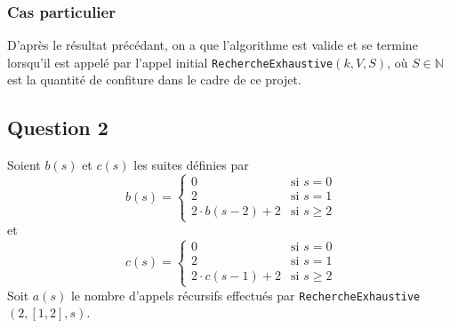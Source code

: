 \documentclass[12pt,a4paper]{article}
\begin{document}
\subsubsection*{Cas particulier}
D'apr\`es le r\'esultat pr\'ec\'edant, on a que l'algorithme est valide et se termine lorsqu'il est appel\'e par l'appel initial \texttt{RechercheExhaustive}$(k,V,S)$, o\`u $S \in \mathbb{N}$ est la quantit\'e de confiture dans le cadre de ce projet. 


\subsection*{Question 2}
Soient $b(s)$ et $c(s)$ les suites d\'efinies par
\[ b(s) = \begin{cases} 
      0 & \text{si } s = 0 \\
      2 & \text{si } s = 1 \\
      2\cdot b(s-2) + 2 & \text{si } s\geq 2 
   \end{cases}
\]
et
\[ c(s) = \begin{cases} 
      0 & \text{si } s = 0 \\
      2 & \text{si } s = 1 \\
      2\cdot c(s-1) + 2 & \text{si } s\geq 2 
   \end{cases}
\]
Soit $a(s)$ le nombre d'appels r\'ecursifs effectu\'es par \texttt{RechercheExhaustive}$(2,[1,2],s)$.
\end{document}
